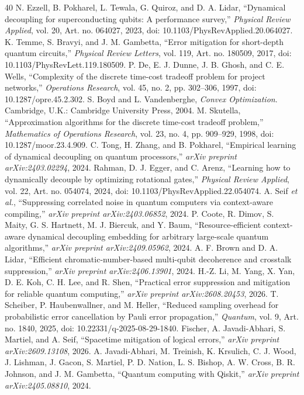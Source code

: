 \documentclass[10pt,letterpaper,journal]{IEEEtran}
\begin{document}
\begin{thebibliography}{40}
 N. Ezzell, B. Pokharel, L. Tewala, G. Quiroz, and D. A. Lidar, ``Dynamical decoupling for superconducting qubits: A performance survey,'' \emph{Physical Review Applied}, vol. 20, Art. no. 064027, 2023, doi: 10.1103/PhysRevApplied.20.064027.
 K. Temme, S. Bravyi, and J. M. Gambetta, ``Error mitigation for short-depth quantum circuits,'' \emph{Physical Review Letters}, vol. 119, Art. no. 180509, 2017, doi: 10.1103/PhysRevLett.119.180509.
 P. De, E. J. Dunne, J. B. Ghosh, and C. E. Wells, ``Complexity of the discrete time-cost tradeoff problem for project networks,'' \emph{Operations Research}, vol. 45, no. 2, pp. 302--306, 1997, doi: 10.1287/opre.45.2.302.
 S. Boyd and L. Vandenberghe, \emph{Convex Optimization}. Cambridge, U.K.: Cambridge University Press, 2004.
 M. Skutella, ``Approximation algorithms for the discrete time-cost tradeoff problem,'' \emph{Mathematics of Operations Research}, vol. 23, no. 4, pp. 909--929, 1998, doi: 10.1287/moor.23.4.909.
 C. Tong, H. Zhang, and B. Pokharel, ``Empirical learning of dynamical decoupling on quantum processors,'' \emph{arXiv preprint arXiv:2403.02294}, 2024.
 Rahman, D. J. Egger, and C. Arenz, ``Learning how to dynamically decouple by optimizing rotational gates,'' \emph{Physical Review Applied}, vol. 22, Art. no. 054074, 2024, doi: 10.1103/PhysRevApplied.22.054074.
 A. Seif \emph{et al.}, ``Suppressing correlated noise in quantum computers via context-aware compiling,'' \emph{arXiv preprint arXiv:2403.06852}, 2024.
 P. Coote, R. Dimov, S. Maity, G. S. Hartnett, M. J. Biercuk, and Y. Baum, ``Resource-efficient context-aware dynamical decoupling embedding for arbitrary large-scale quantum algorithms,'' \emph{arXiv preprint arXiv:2409.05962}, 2024.
 A. F. Brown and D. A. Lidar, ``Efficient chromatic-number-based multi-qubit decoherence and crosstalk suppression,'' \emph{arXiv preprint arXiv:2406.13901}, 2024.
 H.-Z. Li, M. Yang, X. Yan, D. E. Koh, C. H. Lee, and R. Shen, ``Practical error suppression and mitigation for reliable quantum computing,'' \emph{arXiv preprint arXiv:2608.20453}, 2026.
 T. Scheiber, P. Haubenwallner, and M. Heller, ``Reduced sampling overhead for probabilistic error cancellation by Pauli error propagation,'' \emph{Quantum}, vol. 9, Art. no. 1840, 2025, doi: 10.22331/q-2025-08-29-1840.
 Fischer, A. Javadi-Abhari, S. Martiel, and A. Seif, ``Spacetime mitigation of logical errors,'' \emph{arXiv preprint arXiv:2609.13108}, 2026.
 A. Javadi-Abhari, M. Treinish, K. Krsulich, C. J. Wood, J. Lishman, J. Gacon, S. Martiel, P. D. Nation, L. S. Bishop, A. W. Cross, B. R. Johnson, and J. M. Gambetta, ``Quantum computing with Qiskit,'' \emph{arXiv preprint arXiv:2405.08810}, 2024.
\end{thebibliography}
\end{document}
